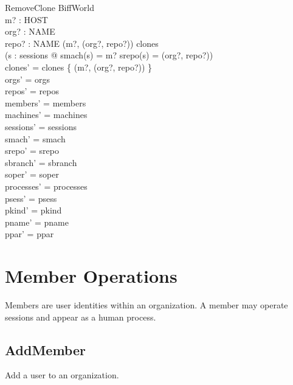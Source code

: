 \documentclass[a4paper,10pt,fleqn]{article}
\begin{document}
\begin{schema}{RemoveClone}
  \Delta BiffWorld \\
  m? : HOST \\
  org? : NAME \\
  repo? : NAME
  \where
  (m?, (org?, repo?)) \in clones \\
  \lnot (\exists s : sessions @
    smach(s) = m? \land srepo(s) = (org?, repo?)) \\
  clones' = clones \setminus \{ (m?, (org?, repo?)) \} \\
  orgs' = orgs \\
  repos' = repos \\
  members' = members \\
  machines' = machines \\
  sessions' = sessions \\
  smach' = smach \\
  srepo' = srepo \\
  sbranch' = sbranch \\
  soper' = soper \\
  processes' = processes \\
  psess' = psess \\
  pkind' = pkind \\
  pname' = pname \\
  ppar' = ppar
\end{schema}

\section{Member Operations}

Members are user identities within an organization.  A member may
operate sessions and appear as a human process.

\subsection{AddMember}

Add a user to an organization.
\end{document}
